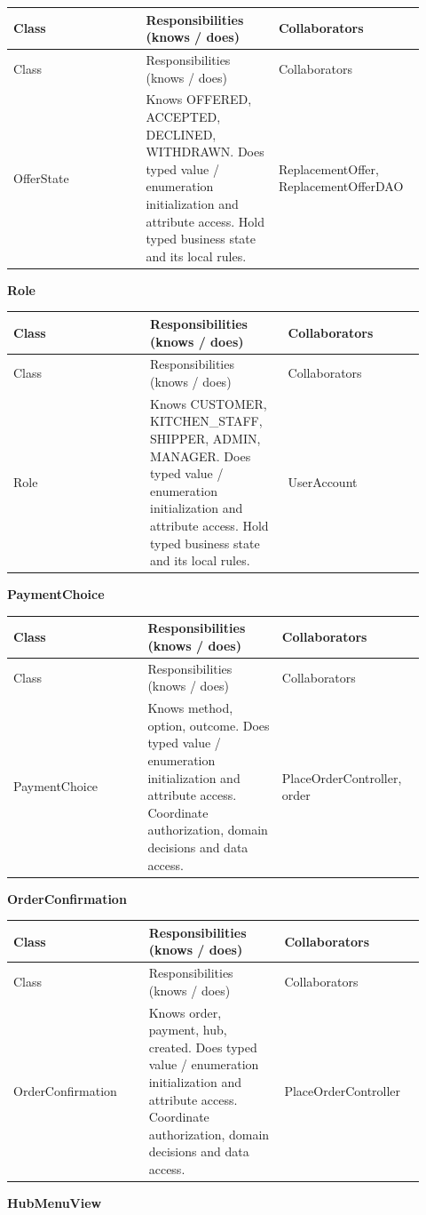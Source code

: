 \begin{longtable}{>{\raggedright\arraybackslash}p{0.3067\linewidth}>{\raggedright\arraybackslash}p{0.3067\linewidth}>{\raggedright\arraybackslash}p{0.3067\linewidth}}
Class & Responsibilities (knows / does) & Collaborators \\
\hline\endfirsthead
Class & Responsibilities (knows / does) & Collaborators \\
\hline\endhead
OfferState & Knows OFFERED, ACCEPTED, DECLINED, WITHDRAWN. Does typed value / enumeration initialization and attribute access. Hold typed business state and its local rules. & ReplacementOffer, ReplacementOfferDAO \\
\end{longtable}
\textbf{Role}

\begin{longtable}{>{\raggedright\arraybackslash}p{0.3067\linewidth}>{\raggedright\arraybackslash}p{0.3067\linewidth}>{\raggedright\arraybackslash}p{0.3067\linewidth}}
Class & Responsibilities (knows / does) & Collaborators \\
\hline\endfirsthead
Class & Responsibilities (knows / does) & Collaborators \\
\hline\endhead
Role & Knows CUSTOMER, KITCHEN\_STAFF, SHIPPER, ADMIN, MANAGER. Does typed value / enumeration initialization and attribute access. Hold typed business state and its local rules. & UserAccount \\
\end{longtable}
\textbf{PaymentChoice}

\begin{longtable}{>{\raggedright\arraybackslash}p{0.3067\linewidth}>{\raggedright\arraybackslash}p{0.3067\linewidth}>{\raggedright\arraybackslash}p{0.3067\linewidth}}
Class & Responsibilities (knows / does) & Collaborators \\
\hline\endfirsthead
Class & Responsibilities (knows / does) & Collaborators \\
\hline\endhead
PaymentChoice & Knows method, option, outcome. Does typed value / enumeration initialization and attribute access. Coordinate authorization, domain decisions and data access. & PlaceOrderController, order \\
\end{longtable}
\textbf{OrderConfirmation}

\begin{longtable}{>{\raggedright\arraybackslash}p{0.3067\linewidth}>{\raggedright\arraybackslash}p{0.3067\linewidth}>{\raggedright\arraybackslash}p{0.3067\linewidth}}
Class & Responsibilities (knows / does) & Collaborators \\
\hline\endfirsthead
Class & Responsibilities (knows / does) & Collaborators \\
\hline\endhead
OrderConfirmation & Knows order, payment, hub, created. Does typed value / enumeration initialization and attribute access. Coordinate authorization, domain decisions and data access. & PlaceOrderController \\
\end{longtable}
\textbf{HubMenuView}

